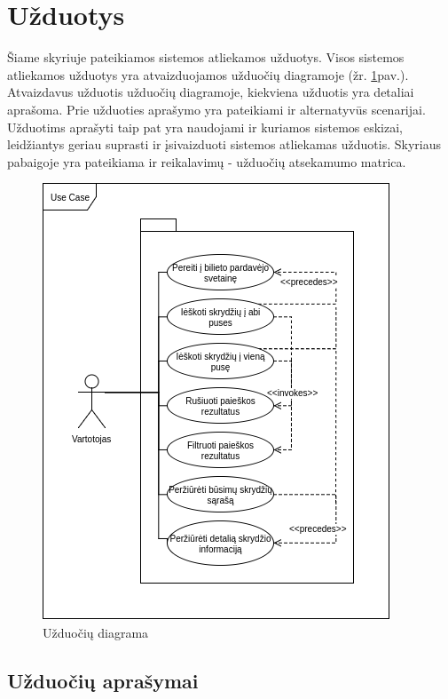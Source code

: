 \documentclass{VUMIFPSkursinis}
\begin{document}
        \section{Užduotys}
        Šiame skyriuje pateikiamos sistemos atliekamos užduotys. Visos sistemos atliekamos užduotys yra atvaizduojamos užduočių diagramoje (žr. \ref{Užduočių diagrama}pav.). Atvaizdavus užduotis užduočių diagramoje, kiekviena užduotis yra detaliai aprašoma. Prie užduoties aprašymo yra pateikiami ir alternatyvūs scenarijai. Užduotims aprašyti taip pat yra naudojami ir kuriamos sistemos eskizai, leidžiantys geriau suprasti ir įsivaizduoti sistemos atliekamas užduotis. Skyriaus pabaigoje yra pateikiama ir reikalavimų - užduočių atsekamumo matrica.
            \begin{figure}[H]
                \centering
                \includegraphics[scale=1]{img/use_case}
                \caption{Užduočių diagrama}
                \label{Užduočių diagrama}
            \end{figure}
            \subsection{Užduočių aprašymai}
                
\end{document}
